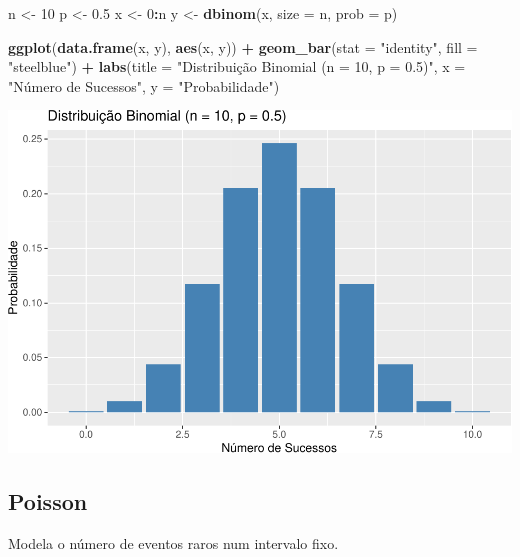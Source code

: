 \documentclass[
]{book}
\newenvironment{Shaded}{\begin{snugshade}}{\end{snugshade}}
\newcommand{\AttributeTok}[1]{\textcolor[rgb]{0.13,0.29,0.53}{#1}}
\newcommand{\DecValTok}[1]{\textcolor[rgb]{0.00,0.00,0.81}{#1}}
\newcommand{\FloatTok}[1]{\textcolor[rgb]{0.00,0.00,0.81}{#1}}
\newcommand{\FunctionTok}[1]{\textcolor[rgb]{0.13,0.29,0.53}{\textbf{#1}}}
\newcommand{\NormalTok}[1]{#1}
\newcommand{\OtherTok}[1]{\textcolor[rgb]{0.56,0.35,0.01}{#1}}
\newcommand{\SpecialCharTok}[1]{\textcolor[rgb]{0.81,0.36,0.00}{\textbf{#1}}}
\newcommand{\StringTok}[1]{\textcolor[rgb]{0.31,0.60,0.02}{#1}}
\begin{document}
\begin{Shaded}
\begin{Highlighting}[]
\NormalTok{n }\OtherTok{\textless{}{-}} \DecValTok{10}
\NormalTok{p }\OtherTok{\textless{}{-}} \FloatTok{0.5}
\NormalTok{x }\OtherTok{\textless{}{-}} \DecValTok{0}\SpecialCharTok{:}\NormalTok{n}
\NormalTok{y }\OtherTok{\textless{}{-}} \FunctionTok{dbinom}\NormalTok{(x, }\AttributeTok{size =}\NormalTok{ n, }\AttributeTok{prob =}\NormalTok{ p)}

\FunctionTok{ggplot}\NormalTok{(}\FunctionTok{data.frame}\NormalTok{(x, y), }\FunctionTok{aes}\NormalTok{(x, y)) }\SpecialCharTok{+}
  \FunctionTok{geom\_bar}\NormalTok{(}\AttributeTok{stat =} \StringTok{"identity"}\NormalTok{, }\AttributeTok{fill =} \StringTok{"steelblue"}\NormalTok{) }\SpecialCharTok{+}
  \FunctionTok{labs}\NormalTok{(}\AttributeTok{title =} \StringTok{"Distribuição Binomial (n = 10, p = 0.5)"}\NormalTok{, }\AttributeTok{x =} \StringTok{"Número de Sucessos"}\NormalTok{, }\AttributeTok{y =} \StringTok{"Probabilidade"}\NormalTok{)}
\end{Highlighting}
\end{Shaded}

\includegraphics{LivroEstatisticaR_files/figure-latex/binomialDist-1.pdf}

\subsection{Poisson}\label{poisson}

Modela o número de eventos raros num intervalo fixo.
\end{document}
